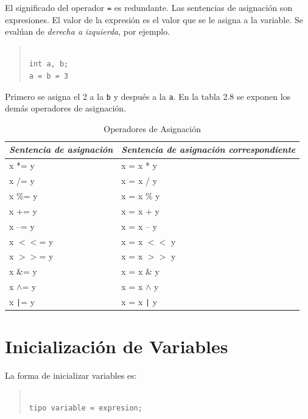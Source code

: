 El significado del operador \texttt{=} es redundante. Las sentencias de 
asignaci\'on son expresiones. El valor de la expresi\'on es el valor que se
le asigna a la variable. Se eval\'uan de \emph{derecha a izquierda}, por
ejemplo.


\begin{quotation}
\begin{verbatim}

int a, b;
a = b = 3

\end{verbatim}
\end{quotation}


Primero se asigna el 2 a la \texttt{b} y despu\'es a la \texttt{a}. En la tabla
2.8 se exponen los dem\'as operadores de asignaci\'on.

\begin{table}[!hbp]
\begin{tabular}{|p{0.8in}|p{1.1in}|}\hline
\em Sentencia de asignaci\'on & \em Sentencia de asignaci\'on correspondiente\\
\hline
\hline
x *= y & x = x * y\\\hline
x /= y & x = x / y\\\hline
x \%= y & x = x \% y\\\hline
x += y & x = x + y\\\hline
x --= y & x = x -- y\\\hline
x $<<$= y & x = x $<<$ y\\\hline
x $>>$= y & x = x $>>$ y\\\hline
x \&= y & x = x \& y\\\hline
x $\land$= y & x = x $\land$ y\\\hline
x \texttt{|}= y & x = x \texttt{|} y\\\hline

\end{tabular}
\caption{Operadores de Asignaci\'on}
\end{table}

\section{Inicializaci\'on de Variables}

La forma de inicializar variables es:

\begin{quotation}
\begin{verbatim}

tipo variable = expresion;

\end{verbatim}
\end{quotation}

